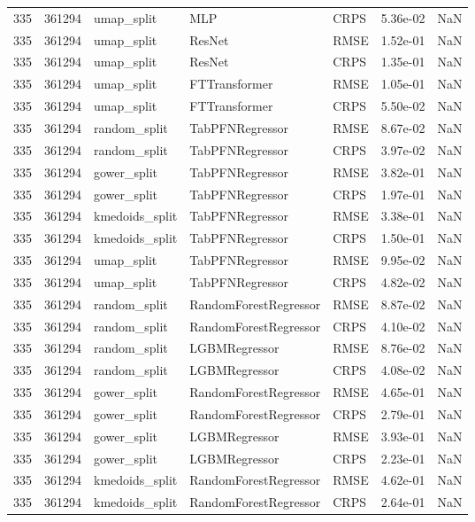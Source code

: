 \begin{tabular}{rrlllrr}
335 & 361294 & umap\_split & MLP & CRPS & 5.36e-02 & NaN \\
335 & 361294 & umap\_split & ResNet & RMSE & 1.52e-01 & NaN \\
335 & 361294 & umap\_split & ResNet & CRPS & 1.35e-01 & NaN \\
335 & 361294 & umap\_split & FTTransformer & RMSE & 1.05e-01 & NaN \\
335 & 361294 & umap\_split & FTTransformer & CRPS & 5.50e-02 & NaN \\
335 & 361294 & random\_split & TabPFNRegressor & RMSE & 8.67e-02 & NaN \\
335 & 361294 & random\_split & TabPFNRegressor & CRPS & 3.97e-02 & NaN \\
335 & 361294 & gower\_split & TabPFNRegressor & RMSE & 3.82e-01 & NaN \\
335 & 361294 & gower\_split & TabPFNRegressor & CRPS & 1.97e-01 & NaN \\
335 & 361294 & kmedoids\_split & TabPFNRegressor & RMSE & 3.38e-01 & NaN \\
335 & 361294 & kmedoids\_split & TabPFNRegressor & CRPS & 1.50e-01 & NaN \\
335 & 361294 & umap\_split & TabPFNRegressor & RMSE & 9.95e-02 & NaN \\
335 & 361294 & umap\_split & TabPFNRegressor & CRPS & 4.82e-02 & NaN \\
335 & 361294 & random\_split & RandomForestRegressor & RMSE & 8.87e-02 & NaN \\
335 & 361294 & random\_split & RandomForestRegressor & CRPS & 4.10e-02 & NaN \\
335 & 361294 & random\_split & LGBMRegressor & RMSE & 8.76e-02 & NaN \\
335 & 361294 & random\_split & LGBMRegressor & CRPS & 4.08e-02 & NaN \\
335 & 361294 & gower\_split & RandomForestRegressor & RMSE & 4.65e-01 & NaN \\
335 & 361294 & gower\_split & RandomForestRegressor & CRPS & 2.79e-01 & NaN \\
335 & 361294 & gower\_split & LGBMRegressor & RMSE & 3.93e-01 & NaN \\
335 & 361294 & gower\_split & LGBMRegressor & CRPS & 2.23e-01 & NaN \\
335 & 361294 & kmedoids\_split & RandomForestRegressor & RMSE & 4.62e-01 & NaN \\
335 & 361294 & kmedoids\_split & RandomForestRegressor & CRPS & 2.64e-01 & NaN \\

\end{tabular}
